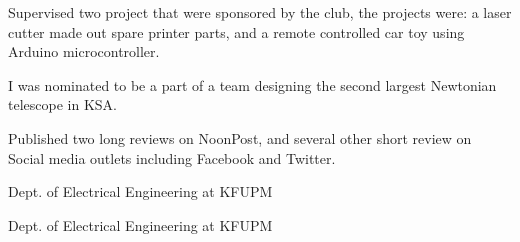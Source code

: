 



Supervised two project that were sponsored by the club, the projects were: a laser cutter made out spare printer parts, and a remote controlled car toy using Arduino microcontroller.

\divider


I was nominated to be a part of a team designing the second largest  Newtonian telescope in KSA.


\divider


Published two long reviews on NoonPost, and several other short review on Social media outlets including Facebook and Twitter.





{}

\hfill Dept. of Electrical Engineering at KFUPM

\divider

\hfill Dept. of Electrical Engineering at KFUPM

